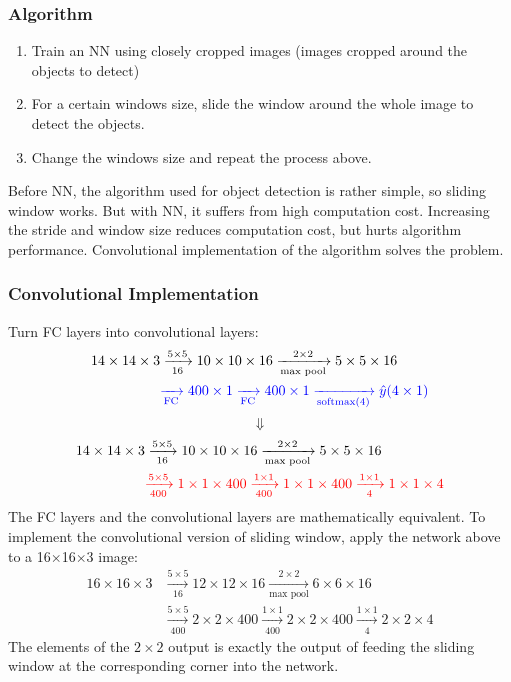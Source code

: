 \subsubsection{Algorithm}
\begin{enumerate}
  \item Train an NN using closely cropped images (images cropped around the objects to detect)
  \item For a certain windows size, slide the window around the whole image to detect the objects.
  \item Change the windows size and repeat the process above.
\end{enumerate}
Before NN, the algorithm used for object detection is rather simple, so sliding window works. But with NN, it suffers from high computation cost. Increasing the stride and window size reduces computation cost, but hurts algorithm performance. Convolutional implementation of the algorithm solves the problem.
\subsubsection{Convolutional Implementation}
Turn FC layers into convolutional layers:
\begin{align*}
  14\times 14\times 3&\xrightarrow[16]{5\times 5}10\times 10\times 16\xrightarrow[\text{max pool}]{2\times 2}5\times 5\times 16\\
  &{\color{blue}\xrightarrow[\text{FC}]{}400\times 1\xrightarrow[\text{FC}]{}400\times 1\xrightarrow[\text{softmax(4)}]{}\hat{y}(4\times 1)}
\end{align*}
\[\Downarrow\]
\begin{align*}
  14\times 14\times 3&\xrightarrow[16]{5\times 5}10\times 10\times 16\xrightarrow[\text{max pool}]{2\times 2}5\times 5\times 16\\
  &{\color{red}\xrightarrow[400]{5\times 5}1\times 1\times 400\xrightarrow[400]{1\times 1}1\times 1\times 400\xrightarrow[4]{1\times 1}1\times 1\times 4}
\end{align*}
The FC layers and the convolutional layers are mathematically equivalent. To implement the convolutional version of sliding window, apply the network above to a 16$\times$16$\times$3 image:
\begin{align*}
  16\times 16\times 3&\xrightarrow[16]{5\times 5}12\times 12\times 16\xrightarrow[\text{max pool}]{2\times 2}6\times 6\times 16\\
  &\xrightarrow[400]{5\times 5}2\times 2\times 400\xrightarrow[400]{1\times 1}2\times 2\times 400\xrightarrow[4]{1\times 1}2\times 2\times 4
\end{align*}
The elements of the $2\times 2$ output is exactly the output of feeding the sliding window at the corresponding corner into the network.

